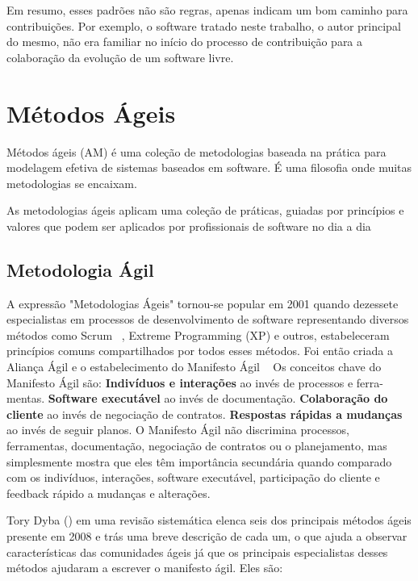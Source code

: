 
Em resumo, esses padrões não são regras, apenas indicam um bom caminho para contribuições. Por exemplo, o software tratado neste trabalho, o autor principal do mesmo, não era familiar no início do processo de contribuição para a colaboração da evolução de um software livre.

\section{Métodos Ágeis}
\label{sec-metedos-ageis}

Métodos ágeis (AM) é uma coleção de metodologias baseada na prática para modelagem efetiva de sistemas baseados em software. É uma filosofia onde muitas metodologias se encaixam.

%
As metodologias ágeis aplicam uma coleção de práticas, guiadas por princípios e valores que podem ser aplicados por profissionais de software no dia a dia~\cite{}%

\subsection{Metodologia Ágil}
\label{metodologia-agil}

A expressão "Metodologias Ágeis" tornou-se popular em 2001 quando dezessete especialistas em processos de desenvolvimento de software representando diversos métodos como Scrum ~\cite{schwaber2002},
Extreme Programming (XP) e outros, estabeleceram princípios comuns compartilhados por todos esses métodos. Foi então criada a Aliança Ágil e o estabelecimento do Manifesto Ágil ~\cite{manifesto2013}
Os conceitos chave do Manifesto Ágil são:
\textbf{Indivíduos e interações} ao invés de processos e ferra-
mentas.
\textbf{Software executável} ao invés de documentação.
\textbf{Colaboração do cliente} ao invés de negociação de contratos.
\textbf{Respostas rápidas a mudanças} ao invés de seguir planos.
O Manifesto Ágil não discrimina processos, ferramentas, documentação, negociação de contratos ou o planejamento, mas simplesmente mostra que eles têm importância secundária quando comparado com os indivíduos, interações, software executável, participação do cliente e feedback rápido a mudanças e alterações.

%
Tory Dyba (\citeyear{dyba2008}) em uma revisão sistemática elenca seis dos principais métodos ágeis presente em 2008 e trás uma breve descrição de cada um, o que ajuda a observar características das comunidades ágeis já que os principais especialistas desses métodos ajudaram a escrever o manifesto ágil. Eles são:

